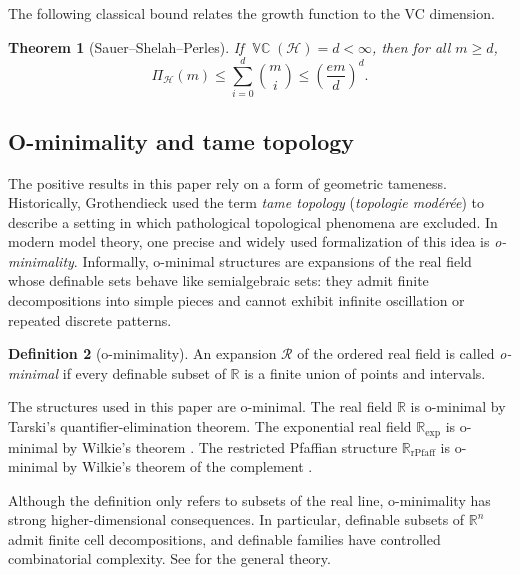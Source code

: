 \documentclass[11pt]{article}
\theoremstyle{plain}
\newtheorem{theorem}{Theorem}[section]
\theoremstyle{definition}
\newtheorem{definition}[theorem]{Definition}
\theoremstyle{remark}
\DeclareMathOperator{\VCdim}{\mathbb{VC}}
\newcommand{\R}{\mathbb{R}}
\newcommand{\rPfaff}{\operatorname{rPfaff}}
\begin{document}
The following classical bound relates the growth function to the VC dimension.

\begin{theorem}[Sauer--Shelah--Perles]
\label{thm:ssp}
If \(\VCdim(\mathcal H)=d<\infty\), then for all \(m\ge d\),
\[
  \Pi_{\mathcal H}(m)
  \le
  \sum_{i=0}^d \binom{m}{i}
  \le
  \left(\frac{em}{d}\right)^d.
\]
\end{theorem}
\subsection{O-minimality and tame topology}

The positive results in this paper rely on a form of geometric tameness.
Historically, Grothendieck \cite{Gro} used the term \emph{tame topology}
(\emph{topologie modérée}) to describe a setting in which pathological
topological phenomena are excluded. In modern model theory, one precise and
widely used formalization of this idea is \emph{o-minimality}. Informally,
o-minimal structures are expansions of the real field whose definable sets
behave like semialgebraic sets: they admit finite decompositions into
simple pieces and cannot exhibit infinite oscillation or repeated discrete
patterns.

\begin{definition}[o-minimality]
An expansion \(\mathcal R\) of the ordered real field is called
\emph{o-minimal} if every definable subset of \(\R\) is a finite union of
points and intervals.
\end{definition}


The structures used in this paper are o-minimal. The real field \(\R\) is
o-minimal by Tarski's quantifier-elimination theorem. The exponential real field
\(\R_{\exp}\) is o-minimal by Wilkie's theorem
\cite{Wilkie1996modelcompleteness}. The restricted Pfaffian structure
\(\R_{\rPfaff}\) is o-minimal by Wilkie's theorem of the complement
\cite{Wilkie1999Complement}.


Although the definition only refers to subsets of the real line, o-minimality
has strong higher-dimensional consequences. In particular, definable subsets of
\(\R^n\) admit finite cell decompositions, and definable families have
controlled combinatorial complexity. See \cite{vandenDries98} for the
general theory.
\end{document}
